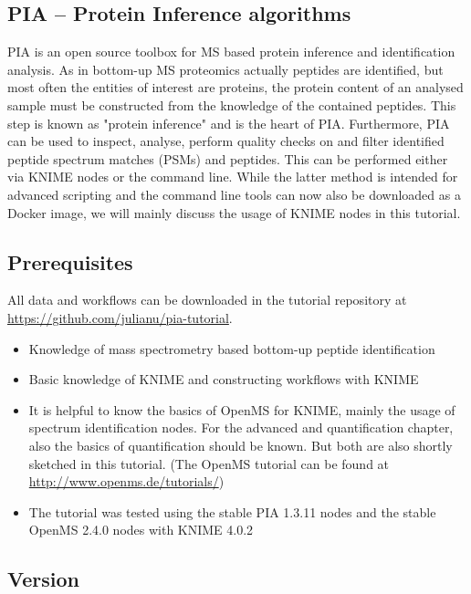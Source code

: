 \documentclass[a4paper,11pt,twoside]{article}
\begin{document}
\subsection{PIA -- Protein Inference algorithms}

PIA is an open source toolbox for MS based protein inference and identification
analysis. As in bottom-up MS proteomics actually peptides are identified, but
most often the entities of interest are proteins, the protein content of an
analysed sample must be constructed from the knowledge of the contained
peptides. This step is known as "protein inference" and is the heart of PIA.
Furthermore, PIA can be used to inspect, analyse, perform quality checks
on and filter identified peptide spectrum matches (PSMs) and peptides. This can
be performed either via KNIME nodes or the command line. While the latter
method is intended for advanced scripting and the command line tools can now
also be downloaded as a Docker image, we will mainly discuss the usage of KNIME
nodes in this tutorial.


\subsection{Prerequisites}

All data and workflows can be downloaded in the tutorial repository at\\
\url{https://github.com/julianu/pia-tutorial}.

\begin{itemize}
	\item Knowledge of mass spectrometry based bottom-up peptide identification
	\item Basic knowledge of KNIME and constructing workflows with KNIME

	\item It is helpful to know the basics of OpenMS for KNIME, mainly the usage
	of spectrum identification nodes. For the advanced and quantification chapter,
	also the basics of quantification should be known. But both are also shortly
	sketched in this tutorial. (The OpenMS tutorial can be found at
	\url{http://www.openms.de/tutorials/})

	\item The tutorial was tested using the stable PIA 1.3.11 nodes and the stable
	OpenMS 2.4.0 nodes with KNIME 4.0.2
\end{itemize}

\subsection{Version}
\end{document}
